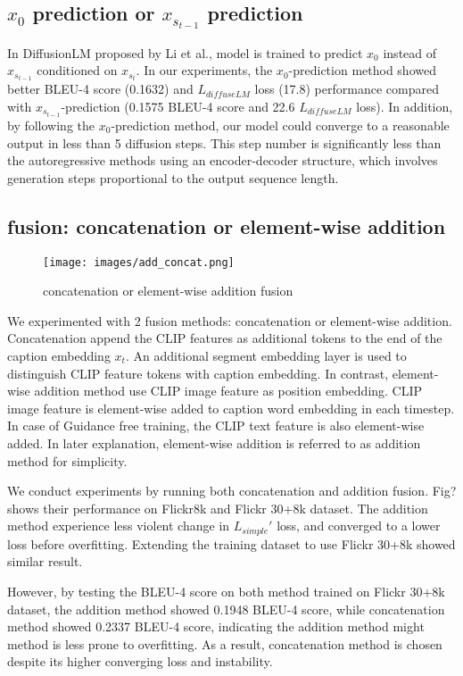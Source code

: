 \documentclass{article}
\begin{document}
\subsection{$x_0$ prediction or $x_{s_{t-1}}$ prediction}
In DiffusionLM proposed by Li et al.\cite{diffuselm}, model is trained to predict $x_0$ instead of $x_{s_{t-1}}$ conditioned on $x_{s_t}$. In our experiments, the $x_0$-prediction method showed better BLEU-4 score (0.1632) and $L_{diffuseLM}$ loss (17.8) performance compared with $x_{s_{t-1}}$-prediction (0.1575 BLEU-4 score and 22.6 $L_{diffuseLM}$ loss). In addition, by following the $x_0$-prediction method, our model could converge to a reasonable output in less than 5 diffusion steps. This step number is significantly less than the autoregressive methods using an encoder-decoder structure, which involves generation steps proportional to the output sequence length.

\subsection{fusion: concatenation or element-wise addition}
\begin{figure}
  \centering
  \texttt{[image: images/add\_concat.png]}
  \caption{concatenation or element-wise addition fusion}
  \label{fig:fig1}
\end{figure}

We experimented with 2 fusion methods: concatenation or element-wise addition. Concatenation append the CLIP features as additional tokens to the end of the caption embedding $x_t$. An additional segment embedding layer is used to distinguish CLIP feature tokens with caption embedding. In contrast, element-wise addition method use CLIP image feature as position embedding. CLIP image feature is element-wise added to caption word embedding in each timestep. In case of Guidance free training, the CLIP text feature is also element-wise added. In later explanation, element-wise addition is referred to as addition method for simplicity.

We conduct experiments by running both concatenation and addition fusion. Fig? shows their performance on Flickr8k and Flickr 30+8k dataset. The addition method experience less violent change in $L_{simple}'$ loss, and converged to a lower loss before overfitting. Extending the training dataset to use Flickr 30+8k showed similar result. 

However, by testing the BLEU-4 score on both method trained on Flickr 30+8k dataset, the addition method showed 0.1948 BLEU-4 score, while concatenation method showed 0.2337 BLEU-4 score, indicating the addition method might  method is less prone to overfitting. As a result, concatenation method is chosen despite its higher converging loss and instability.
\end{document}
